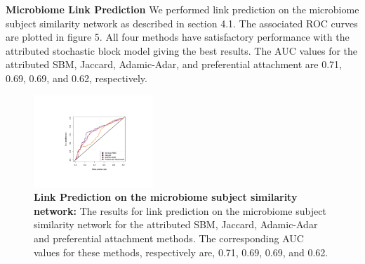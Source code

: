 \documentclass[journal]{IEEEtran}
\begin{document}
{\bf Microbiome Link Prediction}
We performed link prediction on the microbiome subject similarity network as described in section 4.1. The associated ROC curves are plotted in figure 5. All four methods have satisfactory performance with the attributed stochastic block model giving the best results. The AUC values for the attributed SBM, Jaccard, Adamic-Adar, and preferential attachment are 0.71, 0.69, 0.69, and 0.62, respectively. 
 
\begin{figure}
\begin{center}
\includegraphics[width=0.4\textwidth]{ROC_Microbiome.pdf}
\caption{{\bf Link Prediction on the microbiome subject similarity network:} The results for link prediction on the microbiome subject similarity network for the attributed SBM, Jaccard, Adamic-Adar and preferential attachment methods. The corresponding AUC values for these methods, respectively are, 0.71, 0.69, 0.69, and 0.62.}
\end{center}
\end{figure}
\end{document}
